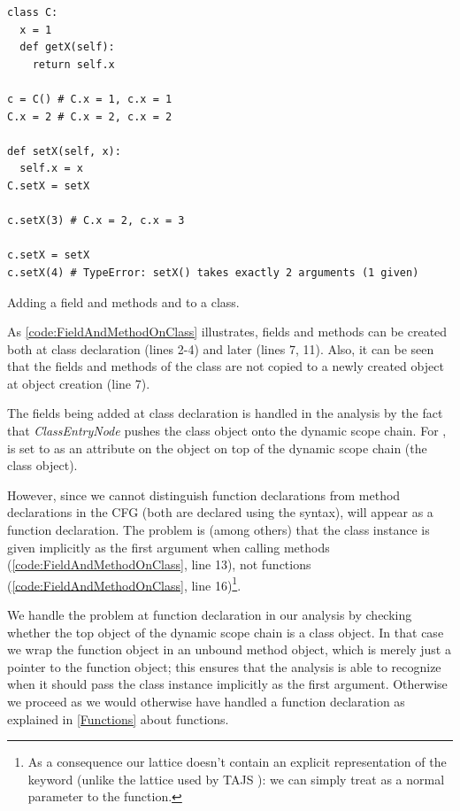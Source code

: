 \begin{listing}[H]
	\begin{verbatim}
class C:
  x = 1
  def getX(self):
    return self.x

c = C() # C.x = 1, c.x = 1
C.x = 2 # C.x = 2, c.x = 2

def setX(self, x):
  self.x = x
C.setX = setX

c.setX(3) # C.x = 2, c.x = 3

c.setX = setX
c.setX(4) # TypeError: setX() takes exactly 2 arguments (1 given)
	\end{verbatim}
	\caption{Adding a field  and methods  and  to a class.}
	\label{code:FieldAndMethodOnClass}
\end{listing}

As \autoref{code:FieldAndMethodOnClass} illustrates, fields and methods can be created both at class declaration (lines 2-4) and later (lines 7, 11). Also, it can be seen that the fields and methods of the class are not copied to a newly created object at object creation (line 7).

The fields being added at class declaration is handled in the analysis by the fact that \textit{ClassEntryNode} pushes the class object onto the dynamic scope chain. For ,  is set to  as an attribute on the object on top of the dynamic scope chain (the class object).

However, since we cannot distinguish function declarations from method declarations in the CFG (both are declared using the  syntax),  will appear as a function declaration. The problem is (among others) that the class instance is given implicitly as the first argument when calling methods (\autoref{code:FieldAndMethodOnClass}, line 13), not functions (\autoref{code:FieldAndMethodOnClass}, line 16)\footnote{As a consequence our lattice doesn't contain an explicit representation of the  keyword (unlike the lattice used by TAJS \cite{tajs}): we can simply treat  as a normal parameter to the function.}.

We handle the problem at function declaration in our analysis by checking whether the top object of the dynamic scope chain is a class object. In that case we wrap the function object in an unbound method object, which is merely just a pointer to the function object; this ensures that the analysis is able to recognize when it should pass the class instance implicitly as the first argument. Otherwise we proceed as we would otherwise have handled a function declaration as explained in \autoref{Functions} about functions.

